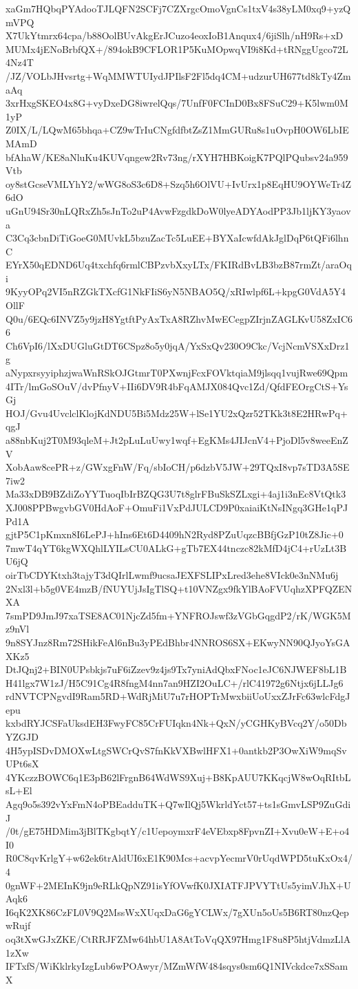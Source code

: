 xaGm7HQbqPYAdooTJLQFN2SCFj7CZXrgcOmoVgnCs1txV4s38yLM0xq9+yzQmVPQ
X7UkYtmrx64cpa/b88OolBUvAkgErJCuzo4eoxIoB1Anqux4/6jiSlh/nH9Rs+xD
MUMx4jENoBrbfQX+/894okB9CFLOR1P5KuMOpwqVI9i8Kd+tRNggUgco72L4Nz4T
/JZ/VOLbJHvsrtg+WqMMWTUIydJPIlsF2Fl5dq4CM+udzurUH677td8kTy4ZmaAq
3xrHxgSKEO4x8G+vyDxeDG8iwrelQqs/7UnfF0FCInD0Bx8FSuC29+K5lwm0M1yP
Z0IX/L/LQwM65bhqa+CZ9wTrIuCNgfdfbtZsZ1MmGURu8s1uOvpH0OW6LbIEMAmD
bfAhaW/KE8aNluKu4KUVqngew2Rv73ng/rXYH7HBKoigK7PQlPQubsv24a959Vtb
oy8stGcseVMLYhY2/wWG8oS3c6D8+Szq5h6OlVU+IvUrx1p8EqHU9OYWeTr4Z6dO
uGnU94Sr30nLQRxZh5sJnTo2uP4AvwFzgdkDoW0lyeADYAodPP3Jb1ljKY3yaova
C3Cq3cbnDiTiGoeG0MUvkL5bzuZacTc5LuEE+BYXaIcwfdAkJglDqP6tQFi6lhnC
EYrX50qEDND6Uq4txchfq6rmlCBPzvbXxyLTx/FKIRdBvLB3bzB87rmZt/araOqi
9KyyOPq2VI5nRZGkTXcfG1NkFIiS6yN5NBAO5Q/xRIwlpf6L+kpgG0VdA5Y4OllF
Q0u/6EQc6INVZ5y9jzH8YgtftPyAxTxA8RZhvMwECegpZIrjnZAGLKvU58ZxIC66
Ch6VpI6/lXxDUGluGtDT6CSpz8o5y0jqA/YxSxQv230O9Ckc/VcjNcmVSXxDrz1g
aNypxrsyyiphzjwaWnRSkOJGtmrT0PXwnjFcxFOVktqiaM9jlsqq1vujRwe69Qpm
4ITr/lmGoSOuV/dvPfnyV+IIi6DV9R4bFqAMJX084Qvc1Zd/QfdFEOrgCtS+YsGj
HOJ/Gvu4UvclclKlojKdNDU5Bi5Mdz25W+lSe1YU2xQzr52TKk3t8E2HRwPq+qgJ
a88nbKuj2T0M93qleM+Jt2pLuLuUwy1wqf+EgKMs4JIJcnV4+PjoDl5v8weeEnZV
XobAaw8cePR+z/GWxgFnW/Fq/sbIoCH/p6dzbV5JW+29TQxI8vp7sTD3A5SE7iw2
Ma33xDB9BZdiZoYYTuoqIbIrBZQG3U7t8glrFBuSkSZLxgi+4aj1i3nEc8VtQtk3
XJ008PPBwgvbGV0HdAoF+OmuFi1VxPdJULCD9P0xaiaiKtNsINgq3GHe1qPJPd1A
gjtP5C1pKmxn8I6LePJ+hIns6Et6D4409hN2Ryd8PZuUqzcBBfjGzP10tZ8Jic+0
7mwT4qYT6kgWXQhlLYILsCU0ALkG+gTb7EX44tnczc82kMfD4jC4+rUzLt3BU6jQ
oirTbCDYKtxh3tajyT3dQIrlLwmf9ucsaJEXFSLIPxLred3ehe8VIck0e3nNMu6j
2Nxl3l+b5g0VE4mzB/fNUYUjJsIgTlSQ+t10VNZgx9fkYlBAoFVUqhzXPFQZENXA
7smPD9JmJ97xaTSE8AC01NjcZd5fm+YNFROJswf3zVGbGqgdP2/rK/WGK5Mz9nVl
9n8SYJnz8Rm72SHikFeAl6nBu3yPEdBhbr4NNROS6SX+EKwyNN90QJyoYsGAXKz5
DtJQnj2+BIN0UPsbkjs7uF6iZzev9z4js9Tx7yniAdQbxFNoc1eJC6NJWEF8bL1B
H41lgx7W1zJ/H5C91Cg4R8fngM4nn7an9HZI2OuLC+/rlC41972g6Ntjx6jLLJg6
rdNVTCPNgvdI9Ram5RD+WdRjMiU7u7rHOPTrMwxbiiUoUxxZJrFc63wlcFdgJepu
kxbdRYJCSFaUksdEH3FwyFC85CrFUIqkn4Nk+QxN/yCGHKyBVcq2Y/o50DbYZGJD
4H5ypISDvDMOXwLtgSWCrQvS7fnKkVXBwlHFX1+0antkb2P3OwXiW9mqSvUPt6sX
4YKczzBOWC6q1E3pB62lFrgnB64WdWS9Xuj+B8KpAUU7KKqcjW8wOqRItbLsL+El
Agq9o5s392vYxFmN4oPBEadduTK+Q7wIlQj5WkrldYct57+ts1sGmvLSP9ZuGdiJ
/0t/gE75HDMim3jBlTKgbqtY/c1UepoymxrF4eVEbxp8FpvnZI+Xvu0eW+E+o4I0
R0C8qvKrlgY+w62ek6trAldUI6xE1K90Mcs+acvpYecmrV0rUqdWPD5tuKxOx4/4
0gnWF+2MEInK9jn9eRLkQpNZ91isYfOVwfK0JXIATFJPVYTtUs5yimVJhX+UAqk6
I6qK2XK86CzFL0V9Q2MssWxXUqxDaG6gYCLWx/7gXUn5oUs5B6RT80nzQepwRujf
oq3tXwGJxZKE/CtRRJFZMw64hbU1A8AtToVqQX97Hmg1F8u8P5htjVdmzLlA1zXw
IFTxfS/WiKklrkyIzgLub6wPOAwyr/MZmWfW484sqys0sm6Q1NIVckdce7xSSamX
